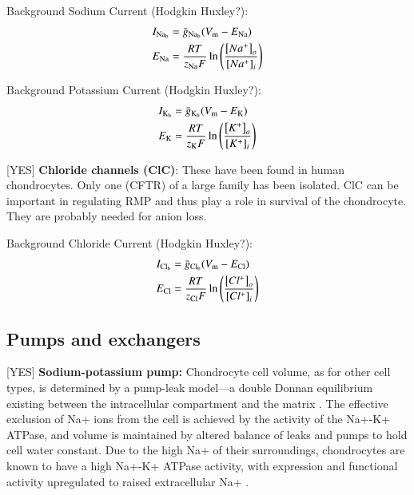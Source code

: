 Background Sodium Current (Hodgkin Huxley?):
\begin{equation}
  \begin{split}
    I_{\rm Na_b} & = \bar{g}_{\rm Na_b} (V_{\rm m} - E_{\rm Na})\\
    E_{\rm Na} & =  \frac{R T}{z_{\rm Na} F}
    \ln\left(\frac{\left[Na^{+}\right]_{o}}
      {\left[Na^{+}\right]_{i}}\right)
  \end{split}
\end{equation}

Background Potassium Current (Hodgkin Huxley?):
\begin{equation}
  \begin{split}
    I_{\rm K_b} & = \bar{g}_{\rm K_b} (V_{\rm m} - E_{\rm K})\\
    E_{\rm K} & =  \frac{R T}{z_{\rm K} F}
    \ln\left(\frac{\left[K^{+}\right]_{o}}
      {\left[K^{+}\right]_{i}}\right)
  \end{split}
\end{equation}

[YES] {\bf Chloride channels (ClC)}: These have been found in human
chondrocytes. Only one (CFTR) of a large family has been isolated. ClC
can be important in regulating RMP and thus play a role in survival of
the chondrocyte. They are probably needed for anion loss.

Background Chloride Current (Hodgkin Huxley?):
\begin{equation}
  \begin{split}
    I_{\rm Cl_b} & = \bar{g}_{\rm Cl_b} (V_{\rm m} - E_{\rm Cl})\\
    E_{\rm Cl} & =  \frac{R T}{z_{\rm Cl} F}
    \ln\left(\frac{\left[Cl^{+}\right]_{o}}
      {\left[Cl^{+}\right]_{i}}\right)
  \end{split}
\end{equation}

\subsection{Pumps and exchangers}
\label{sec:pumps-and-exchangers}

[YES] {\bf Sodium-potassium pump:} Chondrocyte cell volume, as for
other cell types, is determined by a pump-leak model---a double Donnan
equilibrium existing between the intracellular compartment and the
matrix \citep{Stockwell1991}. The effective exclusion of Na+ ions from
the cell is achieved by the activity of the Na+-K+ ATPase, and volume
is maintained by altered balance of leaks and pumps to hold cell water
constant. Due to the high Na+ of their surroundings, chondrocytes are
known to have a high Na+-K+ ATPase activity, with expression and
functional activity upregulated to raised extracellular Na+
\citep{Mobasherietal1997}.

